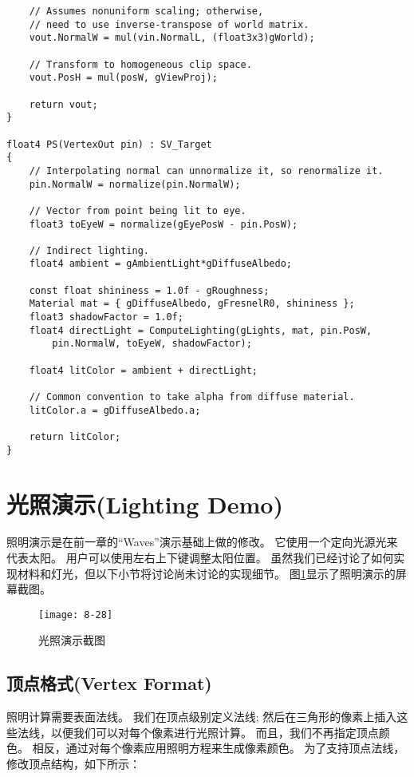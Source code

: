 \begin{lstlisting}
    // Assumes nonuniform scaling; otherwise, 
    // need to use inverse-transpose of world matrix.
    vout.NormalW = mul(vin.NormalL, (float3x3)gWorld);

    // Transform to homogeneous clip space.
    vout.PosH = mul(posW, gViewProj);

    return vout;
}

float4 PS(VertexOut pin) : SV_Target
{
    // Interpolating normal can unnormalize it, so renormalize it.
    pin.NormalW = normalize(pin.NormalW);

    // Vector from point being lit to eye. 
    float3 toEyeW = normalize(gEyePosW - pin.PosW);

    // Indirect lighting.
    float4 ambient = gAmbientLight*gDiffuseAlbedo;

    const float shininess = 1.0f - gRoughness;
    Material mat = { gDiffuseAlbedo, gFresnelR0, shininess };
    float3 shadowFactor = 1.0f;
    float4 directLight = ComputeLighting(gLights, mat, pin.PosW,
        pin.NormalW, toEyeW, shadowFactor);

    float4 litColor = ambient + directLight;

    // Common convention to take alpha from diffuse material.
    litColor.a = gDiffuseAlbedo.a;

    return litColor;
}
\end{lstlisting}

\section{光照演示(Lighting Demo)}
\begin{flushleft}
照明演示是在前一章的“Waves”演示基础上做的修改。 它使用一个定向光源光来代表太阳。 用户可以使用左右上下键调整太阳位置。 虽然我们已经讨论了如何实现材料和灯光，但以下小节将讨论尚未讨论的实现细节。 图\ref{fig:8-28}显示了照明演示的屏幕截图。
\end{flushleft}

\begin{figure}[h]
    \texttt{[image: 8-28]}
    \centering
    \caption{光照演示截图}
    \label{fig:8-28}
\end{figure}

\subsection{顶点格式(Vertex Format)}
\begin{flushleft}
照明计算需要表面法线。 我们在顶点级别定义法线; 然后在三角形的像素上插入这些法线，以便我们可以对每个像素进行光照计算。 而且，我们不再指定顶点颜色。 相反，通过对每个像素应用照明方程来生成像素颜色。 为了支持顶点法线，修改顶点结构，如下所示：\\
\end{flushleft}

